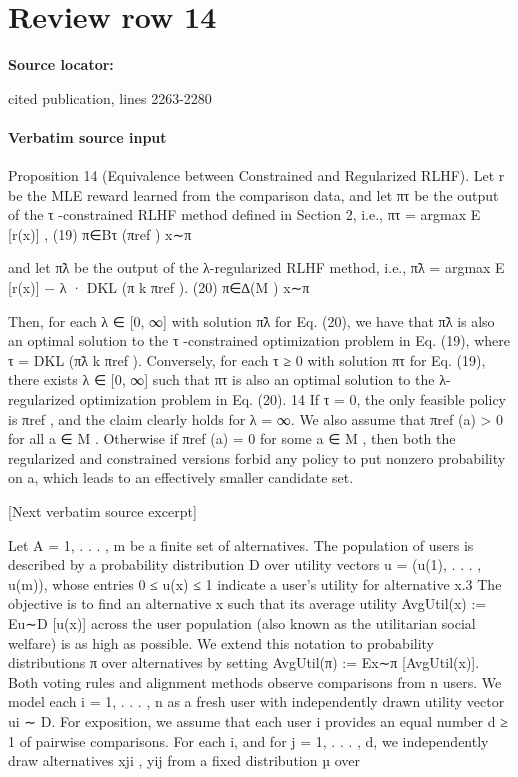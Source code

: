 \documentclass[10pt]{article}
\begin{document}
\section*{Review row 14}
\textbf{Source locator:} {\footnotesize\raggedright cited publication, lines 2263-\allowbreak{}2280\par}
\paragraph{Verbatim source input}
\begin{ReviewVerbatim}
Proposition 14 (Equivalence between Constrained and Regularized RLHF). Let r be the MLE reward
learned from the comparison data, and let πτ be the output of the τ -constrained RLHF method defined
in Section 2, i.e.,
                                         πτ = argmax E [r(x)] ,                                             (19)
                                               π∈Bτ (πref ) x∼π

and let π̃λ be the output of the λ-regularized RLHF method, i.e.,
                              π̃λ = argmax E [r(x)] − λ · DKL (π k πref ).                                  (20)
                                     π∈∆(M ) x∼π

Then, for each λ ∈ [0, ∞] with solution π̃λ for Eq. (20), we have that π̃λ is also an optimal solution
to the τ -constrained optimization problem in Eq. (19), where τ = DKL (π̃λ k πref ). Conversely, for
each τ ≥ 0 with solution πτ for Eq. (19), there exists λ ∈ [0, ∞] such that πτ is also an optimal
solution to the λ-regularized optimization problem in Eq. (20).
   14
      If τ = 0, the only feasible policy is πref , and the claim clearly holds for λ = ∞. We also assume that
πref (a) > 0 for all a ∈ M . Otherwise if πref (a) = 0 for some a ∈ M , then both the regularized and constrained
versions forbid any policy to put nonzero probability on a, which leads to an effectively smaller candidate set.

[Next verbatim source excerpt]

Let A = {1, . . . , m} be a finite set of alternatives. The population of users is described by a
probability distribution D over utility vectors u = (u(1), . . . , u(m)), whose entries 0 ≤ u(x) ≤ 1
indicate a user’s utility for alternative x.3 The objective is to find an alternative x such that its average
utility AvgUtil(x) := Eu∼D [u(x)] across the user population (also known as the utilitarian social
welfare) is as high as possible. We extend this notation to probability distributions π over alternatives
by setting AvgUtil(π) := Ex∼π [AvgUtil(x)].
Both voting rules and alignment methods observe comparisons from n users. We model each
i = 1, . . . , n as a fresh user with independently drawn utility vector ui ∼ D. For exposition, we
assume that each user i provides an equal number d ≥ 1 of pairwise comparisons. For each i,
and for j = 1, . . . , d, we independently draw alternatives xji , yij from a fixed distribution µ over


\end{ReviewVerbatim}
\end{document}
